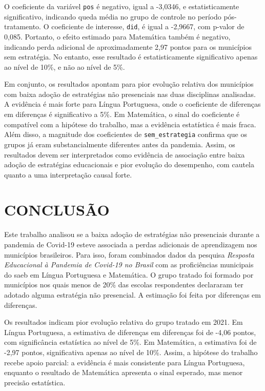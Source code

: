 \documentclass[
	12pt,				%
	openright,			%
	oneside,			%
	a4paper,			%
	brazil,				%
	]{article}
\begin{document}
O coeficiente da variável \texttt{pos} é negativo, igual a -3,0346, e
estatisticamente significativo, indicando queda média no grupo de controle no
período pós-tratamento. O coeficiente de interesse, \texttt{did}, é igual a
-2,9667, com p-valor de 0,085. Portanto, o efeito estimado para Matemática
também é negativo, indicando perda adicional de aproximadamente 2,97 pontos para
os municípios sem estratégia. No entanto, esse resultado é estatisticamente
significativo apenas ao nível de 10\%, e não ao nível de 5\%.

Em conjunto, os resultados apontam para pior evolução relativa dos municípios
com baixa adoção de estratégias não presenciais nas duas disciplinas analisadas.
A evidência é mais forte para Língua Portuguesa, onde o coeficiente de diferenças
em diferenças é significativo a 5\%. Em Matemática, o sinal do coeficiente é
compatível com a hipótese do trabalho, mas a evidência estatística é mais fraca.
Além disso, a magnitude dos coeficientes de \texttt{sem\_estrategia} confirma
que os grupos já eram substancialmente diferentes antes da pandemia. Assim, os
resultados devem ser interpretados como evidência de associação entre baixa
adoção de estratégias educacionais e pior evolução do desempenho, com cautela
quanto a uma interpretação causal forte.

\newpage
\section{CONCLUSÃO}

Este trabalho analisou se a baixa adoção de estratégias não presenciais durante
a pandemia de Covid-19 esteve associada a perdas adicionais de aprendizagem nos
municípios brasileiros. Para isso, foram combinados dados da pesquisa
\textit{Resposta Educacional à Pandemia de Covid-19 no Brasil} com as
proficiências municipais do \acrshort{saeb} em Língua Portuguesa e Matemática.
O grupo tratado foi formado por municípios nos quais menos de 20\% das escolas
respondentes declararam ter adotado alguma estratégia não presencial. A
estimação foi feita por diferenças em diferenças.

Os resultados indicam pior evolução relativa do grupo tratado em 2021. Em
Língua Portuguesa, a estimativa de diferenças em diferenças foi de -4,06 pontos,
com significância estatística ao nível de 5\%. Em Matemática, a estimativa foi de
-2,97 pontos, significativa apenas ao nível de 10\%. Assim, a hipótese do
trabalho recebe apoio parcial: a evidência é mais consistente para Língua
Portuguesa, enquanto o resultado de Matemática apresenta o sinal esperado, mas
menor precisão estatística.
\end{document}
